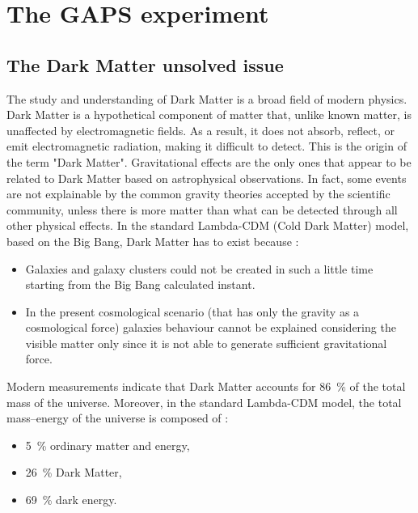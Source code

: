 \chapter{The GAPS experiment} \label{appendixGAPSintro}


\section{The Dark Matter unsolved issue}
The study and understanding of Dark Matter is a broad field of modern physics. Dark Matter is a hypothetical component of matter that, unlike known matter, is unaffected by electromagnetic fields. As a result, it does not absorb, reflect, or emit electromagnetic radiation, making it difficult to detect. This is the origin of the term "Dark Matter". Gravitational effects are the only ones that appear to be related to Dark Matter based on astrophysical observations. In fact, some events are not explainable by the common gravity theories accepted by the scientific community, unless there is more matter than what can be detected through all other physical effects. In the standard Lambda-CDM (Cold Dark Matter) model, based on the Big Bang, Dark Matter has to exist because \cite{aramaki_2016_review}:

\begin{itemize}
    \itemsep0em
    \item Galaxies and galaxy clusters could not be created in such a little time starting from the Big Bang calculated instant.
    \item In the present cosmological scenario (that has only the gravity as a cosmological force) galaxies behaviour cannot be explained considering the visible matter only since it is not able to generate sufficient gravitational force.
\end{itemize}

Modern measurements indicate that Dark Matter accounts for \SI{86}{\percent} of the total mass of the universe. Moreover, in the standard Lambda-CDM model, the total mass–energy of the universe is composed of \cite{feng_2010_dark}:

\begin{itemize}
    \itemsep0em
    \item \SI{5}{\percent} ordinary matter and energy,
    \item \SI{26}{\percent} Dark Matter,
    \item \SI{69}{\percent} dark energy.
\end{itemize}


